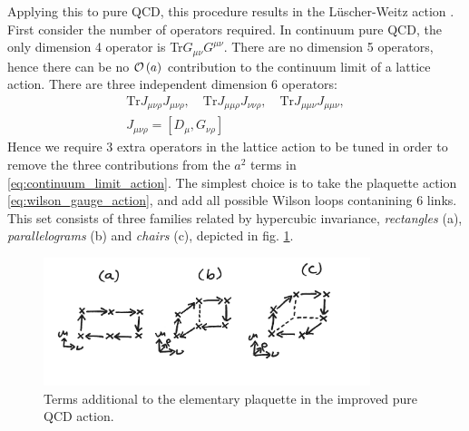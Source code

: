 Applying this to pure QCD, this procedure results in the L\"uscher-Weitz action \cite{luscher1985}. First consider the number of operators required. In continuum pure QCD, the only dimension 4 operator is Tr$G_{\mu\nu}G^{\mu\nu}$. There are no dimension 5 operators, hence there can be no $\mathcal{O}\left( a \right)$ contribution to the continuum limit of a lattice action. There are three independent dimension 6 operators:
\begin{gather}
  \text{Tr} J_{\mu\nu\rho} J_{\mu\nu\rho} ,\quad
  \text{Tr} J_{\mu\mu\rho} J_{\nu\nu\rho} ,\quad
  \text{Tr} J_{\mu\mu\nu} J_{\mu\mu\nu}, \\
  J_{\mu\nu\rho} = [ D_{\mu}, G_{\nu\rho} ] \nonumber
\end{gather}
Hence we require 3 extra operators in the lattice action to be tuned in order to remove the three contributions from the $a^2$ terms in \eqref{eq:continuum_limit_action}. The simplest choice is to take the plaquette action \eqref{eq:wilson_gauge_action}, and add all possible Wilson loops contanining 6 links. This set consists of three families related by hypercubic invariance, {\it{rectangles}} (a), {\it{parallelograms}} (b) and {\it{chairs}} (c), depicted in fig. \ref{fig:LuscherWeitz}.

\begin{figure}
  \begin{center}
    \vspace{-10pt}
    \includegraphics[width=0.85\textwidth]{images/LuscherWeitz.jpg}
    \vspace{-10pt}
    \caption{Terms additional to the elementary plaquette in the improved pure QCD action. \label{fig:LuscherWeitz}}
    \vspace{-10pt}
  \end{center}
\end{figure}

